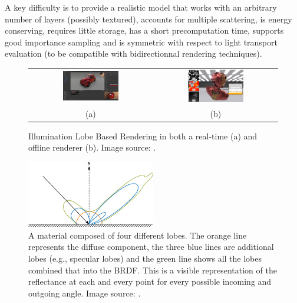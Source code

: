 	\begin{itquote}
		A key difficulty is to provide a realistic model that works with an arbitrary number of layers (possibly textured), accounts for multiple scattering, is energy conserving, requires little storage, has a short precomputation time, supports good importance sampling and is symmetric with respect to light transport evaluation (to be compatible with bidirectionnal rendering techniques). 
	\end{itquote}

	\begin{figure}
		\begin{tabular}{@{}cc@{}}
			\includegraphics[width=0.475\textwidth]{images/03cha_06_raalTimeLobeBeatle.jpg} &		%
			\includegraphics[width=0.475\textwidth]{images/03cha_06_robotOfflineLobeLayering.jpg} \\
			(a) & (b) 
		\end{tabular}
		\caption{Illumination Lobe Based Rendering in both a real-time (a) and offline renderer (b). Image source: \cite[p.\,73:11]{laurent2018efficient}.}
		\label{fig:lobeBasedRealTime}
	\end{figure}

	
	\begin{figure}
		\centering
		\includegraphics[width=0.5\textwidth]{images/03cha_07_IlluminationLobes.jpg}
		\caption[Color Layering]{
			A material composed of four different lobes. The orange line represents the diffuse component, the three blue lines are additional lobes (e.g., specular lobes) and the green line shows all the lobes combined that into the BRDF. This is a visible representation of the reflectance at each and every point for every possible incoming and outgoing angle. Image source: \cite{fernando2004gems}.}
		\label{fig:lobes}
	\end{figure}	
	



